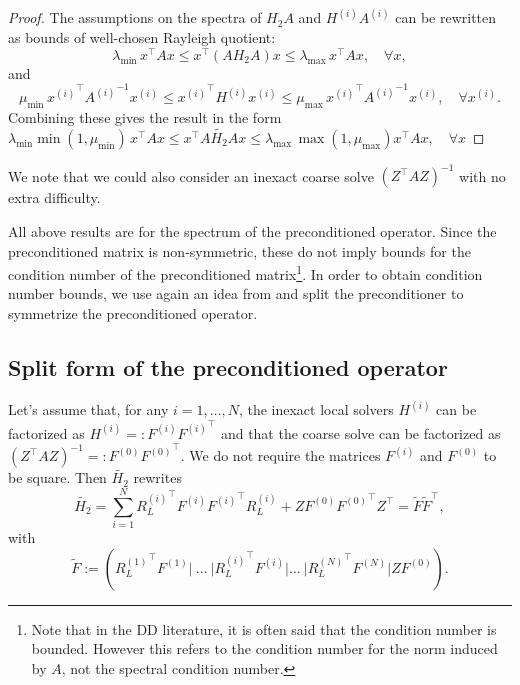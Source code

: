\documentclass[onefignum,onetabnum]{siamart251216}
\newcommand{\Htwo}{H_2}
\newcommand{\Htwoap}{\widetilde{\Htwo}}
\begin{document}
\begin{proof}
The assumptions on the spectra of  $\Htwo A$ and  $H^{(i)} A^{(i)}$ can be rewritten as bounds of well-chosen Rayleigh quotient: 
\[
\lambda_{\min}\, x^\top A x \leq  x^\top (A \Htwo A) x \leq  \lambda_{\max}\, x^\top  A x, \quad \forall x, 
\]
and 
\[
\mu_{\min}\, {x^{(i)} }^\top  {A^{(i)}}^{-1} x^{(i)} \leq    {x^{(i) }}^\top  {H^{(i)}}  x^{(i)}  \leq  \mu_{\max}\, {x^{(i) }}^\top  {A^{(i)}}^{-1} x^{(i)},  \quad \forall x^{(i)}. 
\]
Combining these gives the result in the form\\ $\lambda_{\min} \min (1, \mu_{\min})\, x^\top A x \leq  x^\top A \Htwoap A x \leq    \lambda_{\max}\, \max (1, \mu_{\max})x^\top  A x, \quad \forall x $ 

\end{proof}
We note that we could also consider an inexact coarse solve $(Z^\top A Z)^{-1}$ with no extra difficulty.

All above results are for the spectrum of the preconditioned operator. Since the preconditioned matrix is non-symmetric, these do not imply bounds for the condition number of the preconditioned matrix\footnote{Note that in the DD literature, it is often said that the condition number is bounded. However this refers to the condition number for the norm induced by $A$, not the spectral condition number.}. In order to obtain condition number bounds, we use again an idea from \cite{Deiml_2025} and split the preconditioner to symmetrize the preconditioned operator.  

\subsection{Split form of the preconditioned operator}
\label{sec:splitprec}

Let's assume that, for any $i=1,\dots,N$, the inexact local solvers $H^{(i)}$ can be factorized as $H^{(i)} =: F^{(i)} {F^{(i)}}^\top$ and that the coarse solve can be factorized as $ (Z^\top A Z)^{-1} =: F^{(0)} {F^{(0)}}^\top $. We do not require the matrices $F^{(i)}$ and $F^{(0)}$ to be square. Then $\Htwoap$ rewrites
\begin{equation}
\Htwoap = \sum_{i=1}^N {R_L^{(i)}}^\top F^{(i)} {F^{(i)}}^\top R_L^{(i)} + Z F^{(0)} {F^{(0)}}^\top Z^\top = \tilde{F} \tilde{F}^\top,
\label{eq:decomposition_preconditioner}
\end{equation}
with
\begin{equation}
    \tilde{F} := \left({R_L^{(1)}}^\top F^{(1)} | ~\dots~| {R_L^{(i)}}^\top F^{(i)} | \dots~ | {R_L^{(N)}}^\top F^{(N)} | Z F^{(0)} \right).
\end{equation}
\end{document}
